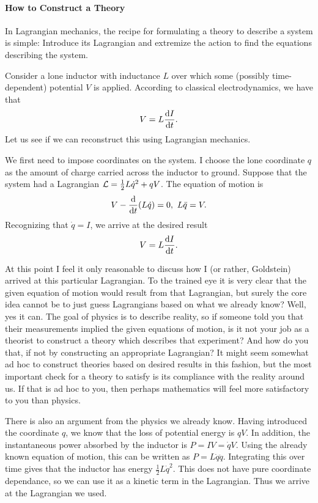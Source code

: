 \paragraph{How to Construct a Theory}
In Lagrangian mechanics, the recipe for formulating a theory to describe a system is simple: Introduce its Lagrangian and extremize the action to find the equations describing the system.

Consider a lone inductor with inductance $L$ over which some (possibly time-dependent) potential $V$ is applied. According to classical electrodynamics, we have that
\begin{align*}
V = L\dv{I}{t}.
\end{align*}
Let us see if we can reconstruct this using Lagrangian mechanics.

We first need to impose coordinates on the system. I choose the lone coordinate $q$ as the amount of charge carried across the inductor to ground. Suppose that the system had a Lagrangian $\mathcal{L} = \frac{1}{2}L\dot{q}^{2} + qV$. The equation of motion is
\begin{align*}
V - \dv{t}(L\dot{q}) = 0,\ L\ddot{q} = V.
\end{align*}
Recognizing that $\dot{q} = I$, we arrive at the desired result
\begin{align*}
V = L\dv{I}{t}.
\end{align*}

At this point I feel it only reasonable to discuss how I (or rather, Goldstein) arrived at this particular Lagrangian. To the trained eye it is very clear that the given equation of motion would result from that Lagrangian, but surely the core idea cannot be to just guess Lagrangians based on what we already know? Well, yes it can. The goal of physics is to describe reality, so if someone told you that their measurements implied the given equations of motion, is it not your job as a theorist to construct a theory which describes that experiment? And how do you that, if not by constructing an appropriate Lagrangian? It might seem somewhat ad hoc to construct theories based on desired results in this fashion, but the most important check for a theory to satisfy is its compliance with the reality around us. If that is ad hoc to you, then perhaps mathematics will feel more satisfactory to you than physics.

There is also an argument from the physics we already know. Having introduced the coordinate $q$, we know that the loss of potential energy is $qV$. In addition, the instantaneous power absorbed by the inductor is $P = IV = \dot{q}V$. Using the already known equation of motion, this can be written as $P = L\dot{q}\ddot{q}$. Integrating this over time gives that the inductor has energy $\frac{1}{2}L\dot{q}^{2}$. This does not have pure coordinate dependance, so we can use it as a kinetic term in the Lagrangian. Thus we arrive at the Lagrangian we used.

